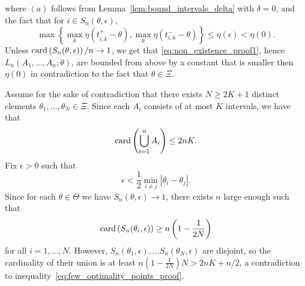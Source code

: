 where $(a)$ follows from Lemma~\ref{lem:bound_intervals_delta} with $\delta =0$, and the fact that for $i \in S_n(\theta, \epsilon)$, 
\begin{equation*}
\max\left\{ \max_k \eta(t^+_{i,k}-\theta) , \max_k \eta(t^-_{i,k}-\theta)  \right\} \leq \eta(\epsilon) < \eta(0). 
\end{equation*}
Unless  $\mathrm{card} \left(S_n(\theta, \epsilon) \right)/n \to 1$, we get that \eqref{eq:non_existence_proof1}, hence $L_n(A_1,\ldots,A_n ; \theta)$, are bounded from above by a constant that is smaller then $\eta(0)$ in contradiction to the fact that $\theta \in \Xi$.

Assume for the sake of contradiction that there exists $N \geq 2K + 1$
distinct elements $\theta_1,\ldots,\theta_N \in \Xi$. Since each $A_i$
consists of at most $K$ intervals, we have that
\begin{equation}
  \label{eq:few_optimality_points_proof}
  \mathrm{card} \left(\bigcup_{i=1}^n  A_i \right) \leq 2 n K. 
\end{equation}
Fix $\epsilon>0$ such that 
\begin{equation*}
  \epsilon < \frac{1}{2}\min_{i\neq j} |\theta_i - \theta_j|. 
\end{equation*}
Since for each $\theta \in \Theta$ we have $S_n(\theta, \epsilon) \to 1$, there exists $n$ large enough such that 
\begin{equation*}
  \mathrm{card} \left(S_n(\theta_i, \epsilon) \right)
  \geq n \left(1-\frac{1}{2N} \right)
\end{equation*}
for all $i=1,\ldots,N$. However, $S_n(\theta_1,\epsilon), \ldots
S_n(\theta_N,\epsilon)$ are disjoint, so the cardinality of their union is
at least $n\left(1-\frac{1}{2N} \right)N > 2nK + n/2$, a contradiction to
inequality~\eqref{eq:few_optimality_points_proof}.

